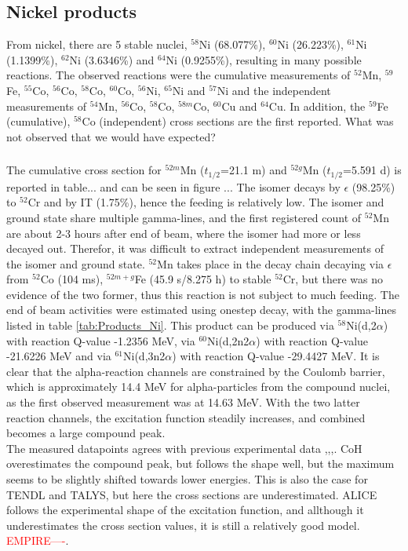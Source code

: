 \subsection{Nickel products}
From nickel, there are 5 stable nuclei, $^{58}$Ni (68.077\%), $^{60}$Ni (26.223\%), $^{61}$Ni (1.1399\%), $^{62}$Ni (3.6346\%) and $^{64}$Ni (0.9255\%), resulting in many possible reactions. The observed reactions were the cumulative measurements of $^{52}$Mn, $^{59}$Fe, $^{55}$Co, $^{56}$Co, $^{58}$Co, $^{60}$Co, $^{56}$Ni, $^{65}$Ni and $^{57}$Ni and the independent measurements of $^{54}$Mn, $^{56}$Co,  $^{58}$Co, $^{58m}$Co, $^{60}$Cu and $^{64}$Cu. In addition, the $^{59}$Fe (cumulative), $^{58}$Co (independent) cross sections are the first reported. What was not observed that we would have expected? 

\subsubsection{}
The cumulative cross section for $^{52m}$Mn ($t_{1/2}$=21.1 m) and $^{52g}$Mn ($t_{1/2}$=5.591 d) \cite{Dong2015} is reported in table... and can be seen in figure ... The isomer decays by $\epsilon$ (98.25\%) to $^{52}$Cr and by IT (1.75\%), hence the feeding is relatively low. The isomer and ground state share multiple gamma-lines, and the first registered count of $^{52}$Mn are about 2-3 hours after end of beam, where the isomer had more or less decayed out. Therefor, it was difficult to extract independent measurements of the isomer and ground state. $^{52}$Mn takes place in the decay chain decaying via $\epsilon$ from $^{52}$Co (104 ms), $^{52m+g}$Fe (45.9 s/8.275 h) to stable $^{52}$Cr, but there was no evidence of the two former, thus this reaction is not subject to much feeding. The end of beam activities were estimated using onestep decay, with the gamma-lines listed in table \ref{tab:Products_Ni}. This product can be produced via  $^{58}$Ni(d,2$\alpha$) with reaction Q-value -1.2356 MeV, via $^{60}$Ni(d,2n2$\alpha$) with reaction Q-value -21.6226  MeV and via $^{61}$Ni(d,3n2$\alpha$) with reaction Q-value -29.4427 MeV. It is clear that the alpha-reaction channels are constrained by the Coulomb barrier, which is approximately 14.4 MeV for alpha-particles from the compound nuclei, as the first observed measurement was at 14.63 MeV. With the two latter reaction channels, the excitation function steadily increases, and combined becomes a large compound peak. \\
\noindent 
The measured datapoints agrees with previous experimental data \cite{Hermanne2013},\cite{Takacs2007},\cite{Usman2016},\cite{Amjed2013}. CoH overestimates the compound peak, but follows the shape well, but the maximum seems to be slightly shifted towards lower energies. This is also the case for TENDL and TALYS, but here the cross sections are underestimated. ALICE follows the experimental shape of the excitation function, and allthough it underestimates the cross section values, it is still a relatively good model. \textcolor{red}{EMPIRE----}. 

